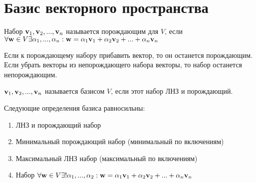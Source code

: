 \documentclass[main]{subfiles}
\begin{document}
\chapter{Базис векторного пространства}
\begin{definition}
    Набор $\mathbf{v}_1, \mathbf{v}_2, ..., \mathbf{v}_n$ называется порождающим для $V$,
    если $\forall \mathbf{w} \in V \exists \alpha_1,..., \alpha_n : \mathbf{w} =
        \alpha_1 \mathbf{v}_1 + \alpha_2 \mathbf{v}_2 + ... + \alpha_n \mathbf{v}_n$
\end{definition}
\begin{prop}
    Если к порождающему набору прибавить вектор, то он останется порождающим.
    Если убрать векторы из непорождающего набора векторы, то набор останется непорождающим.
\end{prop}

\begin{definition}
    $\mathbf{v}_1, \mathbf{v}_2, ..., \mathbf{v}_n$ называется базисом $V$, если этот набор ЛНЗ и порождающий.
\end{definition}
\begin{theorem}[О базисе]
    Следующие определения базиса равносильны:
    \begin{enumerate}
        \item ЛНЗ и  порождающий набор
        \item Минимальный порождающий набор (минимальный по включениям)
        \item Максимальный ЛНЗ набор (максимальный по включениям)
        \item Набор $\forall \mathbf{w} \in V \exists! \alpha_1, ..., \alpha_2:
                  \mathbf{w} = \alpha_1 \mathbf{v}_1 + \alpha_2 \mathbf{v}_2 + ... + \alpha_n \mathbf{v}_n$
    \end{enumerate}
\end{theorem}
\end{document}
